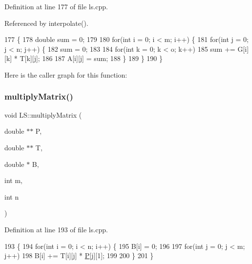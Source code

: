 Definition at line 177 of file ls.\+cpp.



Referenced by interpolate().


\begin{DoxyCode}
177                                                                                 \{
178     \textcolor{keywordtype}{double} sum = 0;
179 
180     \textcolor{keywordflow}{for}(\textcolor{keywordtype}{int} i = 0; i < m; i++) \{
181         \textcolor{keywordflow}{for}(\textcolor{keywordtype}{int} j = 0; j < n; j++) \{
182             sum = 0;
183 
184             \textcolor{keywordflow}{for}(\textcolor{keywordtype}{int} k = 0; k < o; k++)
185                 sum += G[i][k] * T[k][j];
186 
187             A[i][j] = sum;
188         \}
189     \}
190 \}
\end{DoxyCode}
Here is the caller graph for this function\+:
\mbox{\label{class_l_s_a7dc904604ca90e5b711d4c58eda51fcb}} 
\subsubsection{\texorpdfstring{multiply\+Matrix()}{multiplyMatrix()}\hspace{0.1cm}{\footnotesize\ttfamily [2/2]}}
{\footnotesize\ttfamily void L\+S\+::multiply\+Matrix (\begin{DoxyParamCaption}\item[{double $\ast$$\ast$}]{P,  }\item[{double $\ast$$\ast$}]{T,  }\item[{double $\ast$}]{B,  }\item[{int}]{m,  }\item[{int}]{n }\end{DoxyParamCaption})\hspace{0.3cm}{\ttfamily [private]}}



Definition at line 193 of file ls.\+cpp.


\begin{DoxyCode}
193                                                                         \{
194     \textcolor{keywordflow}{for}(\textcolor{keywordtype}{int} i = 0; i < n; i++) \{
195         B[i] = 0;
196 
197         \textcolor{keywordflow}{for}(\textcolor{keywordtype}{int} j = 0; j < m; j++)
198             B[i] += T[i][j] * \hyperlink{class_l_s_aef5aafb3950204592111d32c93721aa3}{P}[j][1];
199 
200     \}
201 \}
\end{DoxyCode}
\mbox{\label{class_l_s_a84e538a99f84e3f72d3a89a725d9d7d8}} 
